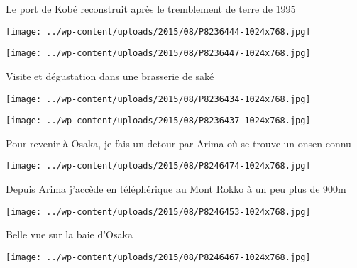  

 Le port de Kobé reconstruit après le tremblement de terre de 1995 

 

\begin{center} \texttt{[image: ../wp-content/uploads/2015/08/P8236444-1024x768.jpg]} \end{center}

 

 

\begin{center} \texttt{[image: ../wp-content/uploads/2015/08/P8236447-1024x768.jpg]} \end{center}

 

 Visite et dégustation dans une brasserie de saké 

 

\begin{center} \texttt{[image: ../wp-content/uploads/2015/08/P8236434-1024x768.jpg]} \end{center}

 

 

\begin{center} \texttt{[image: ../wp-content/uploads/2015/08/P8236437-1024x768.jpg]} \end{center}

 

 Pour revenir à Osaka, je fais un detour par Arima où se trouve un onsen connu 

 

\begin{center} \texttt{[image: ../wp-content/uploads/2015/08/P8246474-1024x768.jpg]} \end{center}

 

 Depuis Arima j'accède en téléphérique au Mont Rokko à un peu plus de 900m 

 

\begin{center} \texttt{[image: ../wp-content/uploads/2015/08/P8246453-1024x768.jpg]} \end{center}

 

 Belle vue sur la baie d'Osaka 

 

\begin{center} \texttt{[image: ../wp-content/uploads/2015/08/P8246467-1024x768.jpg]} \end{center}

